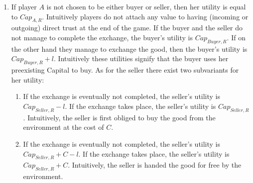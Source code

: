   \begin{enumerate}
    \item If player $A$ is not chosen to be either buyer or seller, then her utility is equal to $Cap_{A, R}$. Intuitively
    players do not attach any value to having (incoming or outgoing) direct trust at the end of the game. If the buyer and the
    seller do not manage to complete the exchange, the buyer's utility is $Cap_{Buyer, R}$. If on the other hand they manage
    to exchange the good, then the buyer's utility is $Cap_{Buyer, R} + l$. Intuitively these utilities signify that the buyer
    uses her preexisting Capital to buy. As for the seller there exist two subvariants for her utility:
    \begin{enumerate}
      \item If the exchange is eventually not completed, the seller's utility is $Cap_{Seller, R} - l$. If the exchange takes
      place, the seller's utility is $Cap_{Seller, R}$. Intuitively, the seller is first obliged to buy the good from the
      environment at the cost of $C$.

      \item If the exchange is eventually not completed, the seller's utility is $Cap_{Seller, R} + C - l$. If the exchange
      takes place, the seller's utility is $Cap_{Seller, R} + C$. Intuitively, the seller is handed the good for free by the
      environment.
    \end{enumerate}
    

\end{enumerate}
